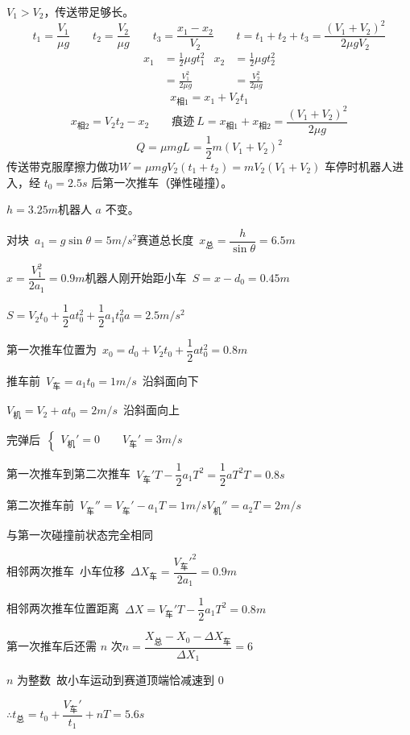 $V_1>V_2$，传送带足够长。
\[
t_1=\frac{V_1}{\mu g}\qquad t_2=\frac{V_2}{\mu g}\qquad t_3=\frac{x_1-x_2}{V_2}\qquad t=t_1+t_2+t_3=\frac{(V_1+V_2)^2}{2\mu gV_2}
\]
\[
\begin{aligned}
x_1&=\frac12\mu gt_1^2 & x_2&=\frac12\mu gt_2^2\\[2pt]
&=\frac{V_1^2}{2\mu g} & &=\frac{V_2^2}{2\mu g}
\end{aligned}
\]
\[
x_{\text{相}1}=x_1+V_2t_1
\]
\[
x_{\text{相}2}=V_2t_2-x_2\qquad \text{痕迹}\ L=x_{\text{相}1}+x_{\text{相}2}=\frac{(V_1+V_2)^2}{2\mu g}
\]
\[
Q=\mu mgL=\frac12m(V_1+V_2)^2
\]
传送带克服摩擦力做功\quad $W=\mu mgV_2(t_1+t_2)=mV_2(V_1+V_2)$
车停时机器人进入，经 $t_0=2.5\unit{s}$ 后第一次推车（弹性碰撞）。%

$h=3.25\unit{m}$\quad 机器人 $a$ 不变。

对块\ $a_1=g\sin\theta=5\unit{m/s^2}$\qquad 赛道总长度\ $x_{\text{总}}=\dfrac{h}{\sin\theta}=6.5\unit{m}$

$x=\dfrac{V_1^2}{2a_1}=0.9\unit{m}$\qquad 机器人刚开始距小车\ $S=x-d_0=0.45\unit{m}$

$S=V_2t_0+\dfrac12at_0^2+\dfrac12a_1t_0^2$\qquad $a=2.5\unit{m/s^2}$

第一次推车位置为\ $x_0=d_0+V_2t_0+\dfrac12at_0^2=0.8\unit{m}$

推车前\ $V_{\text{车}}=a_1t_0=1\unit{m/s}$\ 沿斜面向下

$V_{\text{机}}=V_2+at_0=2\unit{m/s}$\ 沿斜面向上

完弹后\ $\left\{\begin{array}{l}V_{\text{机}}'=0\qquad V_{\text{车}}'=3\unit{m/s}\end{array}\right.$

第一次推车到第二次推车\ $V_{\text{车}}'T-\dfrac12a_1T^2=\dfrac12aT^2$\qquad $T=0.8\unit{s}$

第二次推车前\ $V_{\text{车}}''=V_{\text{车}}'-a_1T=1\unit{m/s}$\qquad $V_{\text{机}}''=a_2T=2\unit{m/s}$ %

与第一次碰撞前状态完全相同

相邻两次推车\ 小车位移\ $\Delta X_{\text{车}}=\dfrac{V_{\text{车}}'^2}{2a_1}=0.9\unit{m}$

相邻两次推车位置距离\ $\Delta X=V_{\text{车}}'T-\dfrac12a_1T^2=0.8\unit{m}$

第一次推车后还需 $n$ 次\qquad $n=\dfrac{X_{\text{总}}-X_0-\Delta X_{\text{车}}}{\Delta X_1}=6$

$n$ 为整数\ 故小车运动到赛道顶端恰减速到 $0$

$\therefore t_{\text{总}}=t_0+\dfrac{V_{\text{车}}'}{t_1}+nT=5.6\unit{s}$ %
